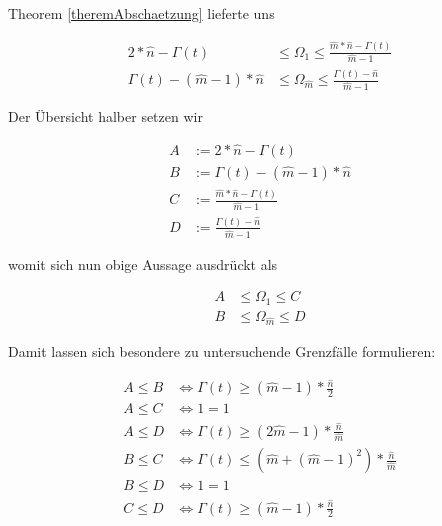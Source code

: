 \begin{Theorem}

Theorem \ref{theremAbschaetzung} lieferte uns

\begin{align*}
2 * \widehat{n} - \Gamma(t) &\leq \Omega_1 \leq \frac{\widehat{m} * \widehat{n} - \Gamma(t)}{\widehat{m} - 1} \\ 
\Gamma(t) - \left( \widehat{m} - 1 \right) * \widehat{n} &\leq \Omega_{\widehat{m}} \leq \frac{\Gamma(t) - \widehat{n}}{\widehat{m} - 1} 
\end{align*}

\vspace{0.5cm}

Der Übersicht halber setzen wir

\begin{align*}
A &:= 2 * \widehat{n} - \Gamma(t) \\
B &:= \Gamma(t) - \left( \widehat{m} - 1 \right) * \widehat{n} \\
C &:= \frac{\widehat{m} * \widehat{n} - \Gamma(t)}{\widehat{m} - 1} \\
D &:= \frac{\Gamma(t) - \widehat{n}}{\widehat{m} - 1}
\end{align*}

womit sich nun obige Aussage ausdrückt als

\begin{align*}
A &\leq \Omega_1 \leq C \\ 
B &\leq \Omega_{\widehat{m}} \leq D 
\end{align*}

Damit lassen sich besondere zu untersuchende Grenzfälle formulieren: 

\begin{align}
A \leq B &\Leftrightarrow \Gamma(t) \geq (\widehat{m}-1) * \frac{\widehat{n}}{2} \tag{i} \\
A \leq C &\Leftrightarrow 1 = 1 \\
A \leq D &\Leftrightarrow \Gamma(t) \geq (2\widehat{m}-1) * \frac{\widehat{n}}{\widehat{m}} \tag{iii} \\
B \leq C &\Leftrightarrow \Gamma(t) \leq (\widehat{m}+(\widehat{m}-1)^2) * \frac{\widehat{n}}{\widehat{m}} \tag{iv} \\
B \leq D &\Leftrightarrow 1 = 1 \tag{v} \\
C \leq D &\Leftrightarrow \Gamma(t) \geq (\widehat{m}-1) * \frac{\widehat{n}}{2} \tag{vi}
\end{align}

\end{Theorem}
\vspace{0.6cm}

